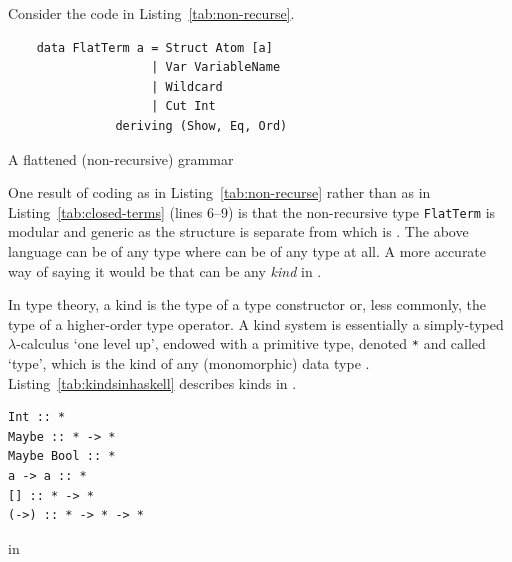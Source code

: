 \documentclass[thesis-solanki.tex]{subfiles}
\begin{document}

Consider the code in Listing~\ref{tab:non-recurse}.
\begin{code-list}[H]
  \begin{verbatim}
    data FlatTerm a = Struct Atom [a]
                    | Var VariableName
                    | Wildcard
                    | Cut Int
               deriving (Show, Eq, Ord)
  \end{verbatim}
  \caption{A flattened (non-recursive) grammar}
  \label{tab:non-recurse}
\end{code-list}

One result of coding as in Listing~\ref{tab:non-recurse} rather than as in Listing~\ref{tab:closed-terms} (lines
6--9) is that the non-recursive type \texttt{FlatTerm} is modular and generic as the structure
 is separate from 
which is .
The above language can be of any type   where  can be of any
type at all.
A more accurate way of saying it would be that  can be any \textit{kind} in
.

In type theory, a kind is the type of a type constructor or, less commonly, the type of a higher-order type
operator.
A kind system is essentially a simply-typed \(\lambda\)-calculus `one level up', endowed with a primitive type,
denoted \Verb!*!
and called `type', which is the kind of any (monomorphic) data type
.
Listing~\ref{tab:kindsinhaskell} describes kinds in .

\begin{code-list}[H]
\begin{verbatim}
Int :: *
Maybe :: * -> *
Maybe Bool :: *
a -> a :: *
[] :: * -> *
(->) :: * -> * -> *
\end{verbatim}
\caption{ in }
\label{tab:kindsinhaskell}
\end{code-list}
\end{document}
